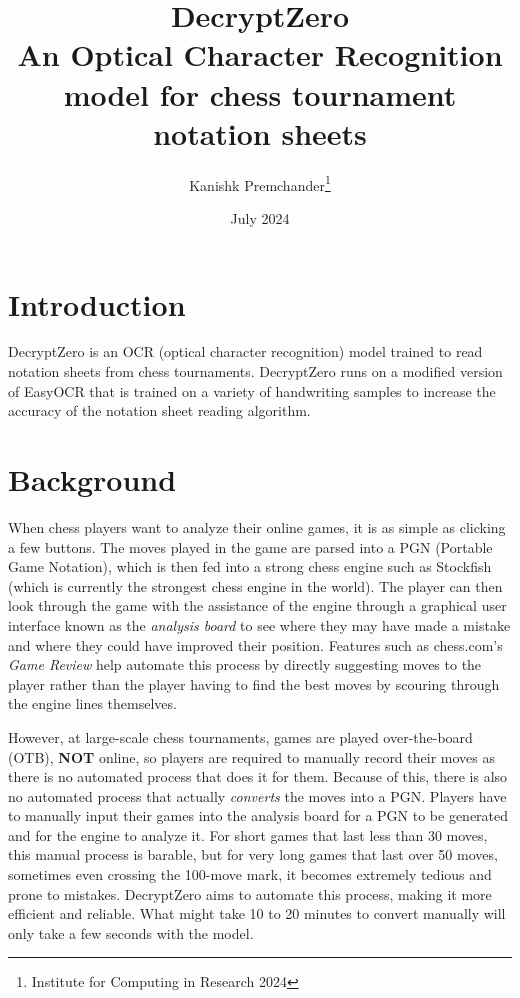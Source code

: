 \documentclass[12pt, two column, letterpaper]{article}
\title{DecryptZero \\ \vspace{0.25cm}
\normalsize An Optical Character Recognition model for chess tournament notation sheets}
\author{Kanishk Premchander\thanks{Institute for Computing in Research 2024}}
\date{July 2024}
\begin{document}
\maketitle


\newpage


\section{Introduction}

DecryptZero is an OCR (optical character recognition) model trained to read notation sheets from chess tournaments.
DecryptZero runs on a modified version of EasyOCR that is trained on a variety of handwriting samples to increase
the accuracy of the notation sheet reading algorithm.

\section{Background}

When chess players want to analyze their online games, it is as simple as clicking a few buttons. The moves played
in the game are parsed into a PGN (Portable Game Notation), which is then fed into a strong chess engine such as 
Stockfish (which is currently the strongest chess engine in the world). The player can then look through the 
game with the assistance of the engine through a graphical user interface known as the \textit{analysis board}
to see where they may have made a mistake and where they could have improved their position. Features such as
chess.com's \textit{Game Review} help automate this process by directly suggesting moves to the player rather
than the player having to find the best moves by scouring through the engine lines themselves.

However, at large-scale chess tournaments, games are played over-the-board (OTB), \textbf{NOT} online, so players
are required to manually record their moves as there is no automated process that does it for them. Because of this,
there is also no automated process that actually \textit{converts} the moves into a PGN. Players have to manually
input their games into the analysis board for a PGN to be generated and for the engine to analyze it. For short games
that last less than 30 moves, this manual process is barable, but for very long games that last over 50 moves,
sometimes even crossing the 100-move mark, it becomes extremely tedious and prone to mistakes. DecryptZero
aims to automate this process, making it more efficient and reliable. What might take 10 to 20 minutes to convert
manually will only take a few seconds with the model.
\end{document}
